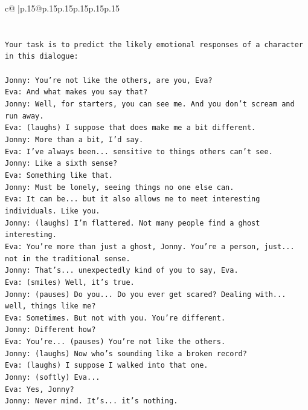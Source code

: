 \documentclass{article}
\begin{document}
{\begin{supertabular}{c@{$\;$}|p{.15\linewidth}@{}p{.15\linewidth}p{.15\linewidth}p{.15\linewidth}p{.15\linewidth}p{.15\linewidth}}
{{{\\ 
\\ 
\\ 
\texttt{Your task is to predict the likely emotional responses of a character in this dialogue:} \\
\\ 
\texttt{Jonny: You're not like the others, are you, Eva?} \\
\texttt{Eva: And what makes you say that?} \\
\texttt{Jonny: Well, for starters, you can see me. And you don't scream and run away.} \\
\texttt{Eva: (laughs) I suppose that does make me a bit different.} \\
\texttt{Jonny: More than a bit, I'd say. } \\
\texttt{Eva: I've always been... sensitive to things others can't see. } \\
\texttt{Jonny: Like a sixth sense?} \\
\texttt{Eva: Something like that. } \\
\texttt{Jonny: Must be lonely, seeing things no one else can.} \\
\texttt{Eva: It can be... but it also allows me to meet interesting individuals. Like you.} \\
\texttt{Jonny: (laughs) I'm flattered. Not many people find a ghost interesting.} \\
\texttt{Eva: You're more than just a ghost, Jonny. You're a person, just... not in the traditional sense.} \\
\texttt{Jonny: That's... unexpectedly kind of you to say, Eva.} \\
\texttt{Eva: (smiles) Well, it's true.} \\
\texttt{Jonny: (pauses) Do you... Do you ever get scared? Dealing with... well, things like me?} \\
\texttt{Eva: Sometimes. But not with you. You're different.} \\
\texttt{Jonny: Different how?} \\
\texttt{Eva: You're... (pauses) You're not like the others.} \\
\texttt{Jonny: (laughs) Now who's sounding like a broken record?} \\
\texttt{Eva: (laughs) I suppose I walked into that one.} \\
\texttt{Jonny: (softly) Eva... } \\
\texttt{Eva: Yes, Jonny?} \\
\texttt{Jonny: Never mind. It's... it's nothing.} \\
}}}
\end{supertabular}}
\end{document}
